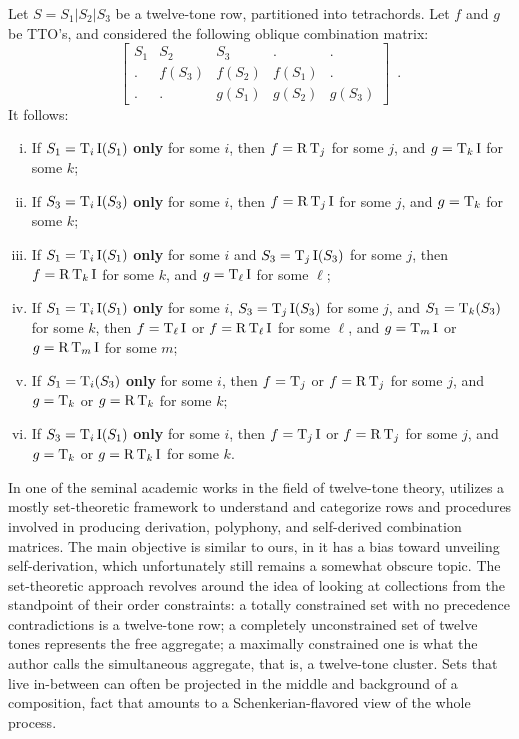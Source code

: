 \begin{example}
	\cite[241]{Martino1961}
	\label{ex:oblique}
	Let $S = S_1 | S_2 | S_3$ be a twelve-tone row, partitioned into tetrachords. Let $f$ and $g$ be TTO's, and considered the following oblique combination matrix:
	\begin{equation}
    	\left[
    	\begin{array}{c|c|c|c|c}
        	S_1 & S_2 & S_3 & . & . \\
        	. & f(S_3) & f(S_2) & f(S_1) & . \\
        	. & . & g(S_1) & g(S_2) & g(S_3)
    	\end{array}
    	\right] \enspace.
	\end{equation}
	It follows:
	\begin{enumerate}[i.]
		\item If $S_1 = \operatorname{T}_i\operatorname{I}(S_1)$ \textbf{only} for some $i$, then $f = \operatorname{R}\operatorname{T}_j$ for some $j$, and $g = \operatorname{T}_k\operatorname{I}$ for some $k$;
		\item If $S_3 = \operatorname{T}_i\operatorname{I}(S_3)$ \textbf{only} for some $i$, then $f = \operatorname{R}\operatorname{T}_j\operatorname{I}$ for some $j$, and $g = \operatorname{T}_k$ for some $k$;
		\item If $S_1 = \operatorname{T}_i\operatorname{I}(S_1)$ \textbf{only} for some $i$ and $S_3 = \operatorname{T}_j\operatorname{I}(S_3)$ for some $j$, then $f = \operatorname{R}\operatorname{T}_k\operatorname{I}$ for some $k$, and $g = \operatorname{T}_\ell\operatorname{I}$ for some $\ell$;
		\item If $S_1 = \operatorname{T}_i\operatorname{I}(S_1)$ \textbf{only} for some $i$, $S_3 = \operatorname{T}_j\operatorname{I}(S_3)$ for some $j$, and $S_1 = \operatorname{T}_k(S_3)$ for some $k$, then $f = \operatorname{T}_\ell\operatorname{I}$ or $f = \operatorname{R}\operatorname{T}_\ell\operatorname{I}$ for some $\ell$, and $g = \operatorname{T}_m\operatorname{I}$ or $g = \operatorname{R}\operatorname{T}_m\operatorname{I}$ for some $m$;
		\item If $S_1 = \operatorname{T}_i(S_3)$ \textbf{only} for some $i$, then $f = \operatorname{T}_j$ or $f = \operatorname{R}\operatorname{T}_j$ for some $j$, and $g = \operatorname{T}_k$ or $g = \operatorname{R}\operatorname{T}_k$ for some $k$;
		\item If $S_3 = \operatorname{T}_i\operatorname{I}(S_1)$ \textbf{only} for some $i$, then $f = \operatorname{T}_j\operatorname{I}$ or $f = \operatorname{R}\operatorname{T}_j$ for some $j$, and $g = \operatorname{T}_k$ or $g = \operatorname{R}\operatorname{T}_k\operatorname{I}$ for some $k$.
	\end{enumerate}
\end{example}

In one of the seminal academic works in the field of twelve-tone theory, \cite{Starr1984} utilizes a mostly set-theoretic framework to understand and categorize rows and procedures involved in producing derivation, polyphony, and self-derived combination matrices. The main objective is similar to ours, in it has a bias toward unveiling self-derivation, which unfortunately still remains a somewhat obscure topic. The set-theoretic approach revolves around the idea of looking at collections from the standpoint of their order constraints: a totally constrained set with no precedence contradictions is a twelve-tone row; a completely unconstrained set of twelve tones represents the free aggregate; a maximally constrained one is what the author calls the simultaneous aggregate, that is, a twelve-tone cluster. Sets that live in-between can often be projected in the middle and background of a composition, fact that amounts to a Schenkerian-flavored view of the whole process.

